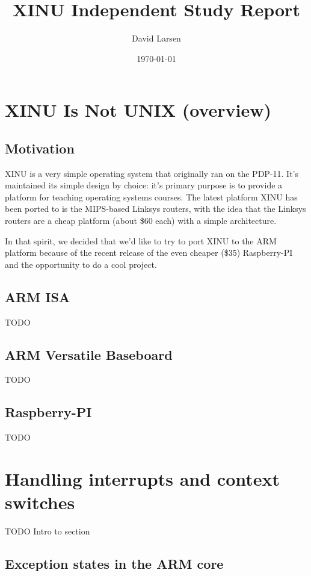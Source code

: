 \documentclass[12pt]{article}
\title{XINU Independent Study Report}
\author{David Larsen}
\date{\today}
\newcommand{\TODO}[1]{{\huge\color{red}TODO \Large #1}}
\begin{document}
\maketitle

\tableofcontents

\section{XINU Is Not U{\small NIX} (overview)}

\subsection{Motivation}

XINU is a very simple operating system that originally ran on the PDP-11. It's
maintained its simple design by choice: it's primary purpose is to provide a
platform for teaching operating systems courses. The latest platform XINU has
been ported to is the MIPS-based Linksys routers, with the idea that the
Linksys routers are a cheap platform (about \$60 each) with a simple
architecture.

In that spirit, we decided that we'd like to try to port XINU to the ARM
platform because of the recent release of the even cheaper (\$35) Raspberry-PI
and the opportunity to do a cool project.

\subsection{ARM ISA}

\TODO{}

\subsection{ARM Versatile Baseboard}

\TODO{}

\subsection{Raspberry-PI}

\TODO{}

\section{Handling interrupts and context switches}

\TODO{Intro to section}

\subsection{Exception states in the ARM core}
\end{document}
